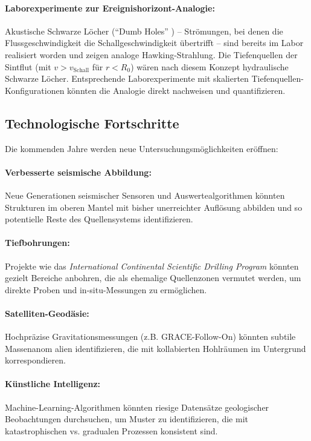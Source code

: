 ﻿\documentclass[12pt,a4paper]{report}
\begin{document}
\paragraph{Laborexperimente zur Ereignishorizont-Analogie:}
Akustische Schwarze Löcher (``Dumb Holes'' \cite{painleve1921}) -- Strömungen, bei denen die Flussgeschwindigkeit die Schallgeschwindigkeit übertrifft -- sind bereits im Labor realisiert worden und zeigen analoge Hawking-Strahlung. Die Tiefenquellen der Sintflut (mit $v > v_{\mathrm{Schall}}$ für $r < R_0$) wären nach diesem Konzept hydraulische Schwarze Löcher. Entsprechende Laborexperimente mit skalierten Tiefenquellen-Konfigurationen könnten die Analogie direkt nachweisen und quantifizieren.

\subsection{Technologische Fortschritte}

Die kommenden Jahre werden neue Untersuchungsmöglichkeiten eröffnen:

\paragraph{Verbesserte seismische Abbildung:}
Neue Generationen seismischer Sensoren und Auswertealgorithmen könnten Strukturen im oberen Mantel mit bisher unerreichter Auflö\-sung abbilden und so potentielle Reste des Quellensystems identifizieren.

\paragraph{Tiefbohrungen:}
Projekte wie das \textit{International Continental Scientific Drilling Program} könnten gezielt Bereiche anbohren, die als ehemalige Quellenzonen vermutet werden, um direkte Proben und in-situ-Messungen zu ermöglichen.

\paragraph{Satelliten-Geodäsie:}
Hochpräzise Gravitationsmessungen (z.B. GRACE-Follow-On) könnten subtile Massenanom ­alien identifizieren, die mit kollabierten Hohlräumen im Untergrund korrespondieren.

\paragraph{Künstliche Intelligenz:}
Machine-Learning-Algorithmen könnten riesige Datensätze geologischer Beobachtungen durchsuchen, um Muster zu identifizieren, die mit katastrophischen vs. gradualen Prozessen konsistent sind.
\end{document}
